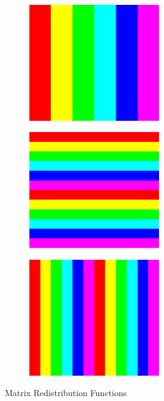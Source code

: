 \begin{figure}[ht]
\\[.3cm]
        \begin{subfigure}[b]{0.3\textwidth}
\includegraphics[height=5cm,width=\textwidth]{pbdDEMO-include/pics/colblock}
                \caption{}
        \end{subfigure}
        \hspace{.1cm}
        \begin{subfigure}[b]{0.3\textwidth}
\includegraphics[height=5cm,width=\textwidth]{pbdDEMO-include/pics/rowcyclic}
                \caption{}
        \end{subfigure}
        \hspace{.1cm}
        \begin{subfigure}[b]{0.3\textwidth}
\includegraphics[height=5cm,width=\textwidth]{pbdDEMO-include/pics/colcyclic}
                \caption{}
        \end{subfigure}
        
        \caption{Matrix Redistribution Functions}
        \label{fig:redistplots}
\end{figure}

